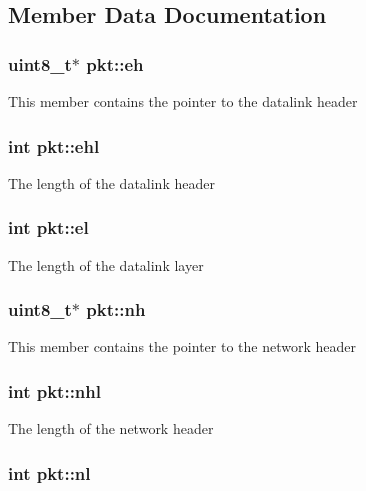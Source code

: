 \subsection{Member Data Documentation}
\hypertarget{structpkt_ade4eeb65427ac816b5cac5a8cb3ae69e}{
\subsubsection[{eh}]{\setlength{\rightskip}{0pt plus 5cm}uint8\-\_\-t$\ast$ pkt\-::eh}}\label{structpkt_ade4eeb65427ac816b5cac5a8cb3ae69e}
This member contains the pointer to the datalink header \hypertarget{structpkt_a8613fb0e3a55e94f5c3a901e293797b6}{
\subsubsection[{ehl}]{\setlength{\rightskip}{0pt plus 5cm}int pkt\-::ehl}}\label{structpkt_a8613fb0e3a55e94f5c3a901e293797b6}
The length of the datalink header \hypertarget{structpkt_a10a6c3fee7f10d921e69cc110affce1a}{
\subsubsection[{el}]{\setlength{\rightskip}{0pt plus 5cm}int pkt\-::el}}\label{structpkt_a10a6c3fee7f10d921e69cc110affce1a}
The length of the datalink layer \hypertarget{structpkt_aea852a33d098462380781546cd19bf1f}{
\subsubsection[{nh}]{\setlength{\rightskip}{0pt plus 5cm}uint8\-\_\-t$\ast$ pkt\-::nh}}\label{structpkt_aea852a33d098462380781546cd19bf1f}
This member contains the pointer to the network header \hypertarget{structpkt_aae31018cd81255ca1114f0830e839cd3}{
\subsubsection[{nhl}]{\setlength{\rightskip}{0pt plus 5cm}int pkt\-::nhl}}\label{structpkt_aae31018cd81255ca1114f0830e839cd3}
The length of the network header \hypertarget{structpkt_add67017449f875df4752e40b3d10eda7}{
\subsubsection[{nl}]{\setlength{\rightskip}{0pt plus 5cm}int pkt\-::nl}}\label{structpkt_add67017449f875df4752e40b3d10eda7}
